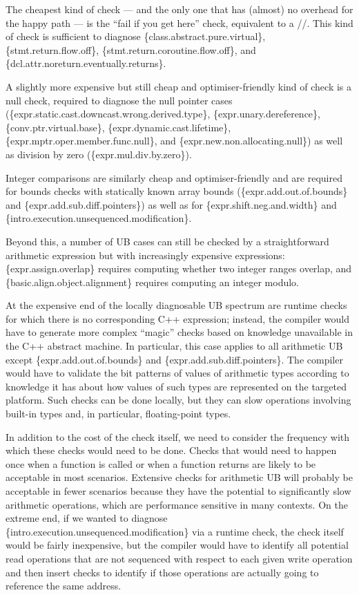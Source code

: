 The cheapest kind of check --- and the only one that has (almost) no overhead for the happy path --- is the ``fail if you get here'' check, equivalent to a //. This kind of check is sufficient to diagnose \{class.abstract.pure.virtual\}, \{stmt.return.flow.off\}, \{stmt.return.coroutine.flow.off\}, and \{dcl.attr.noreturn.eventually.returns\}.

A slightly more expensive but still cheap and optimiser-friendly kind of check is a null check, required to diagnose the null pointer cases  
(\{expr.static.cast.downcast.wrong.derived.type\},
\{expr.unary.deref\-erence\},
\{conv.ptr.virtual.base\},
\{expr.dynamic.cast.lifetime\}, 
\{expr.mptr.oper.member.\linebreak[3]func.null\}, and
\{expr.new.non.allocating.null\})
as well as division by zero (\{expr.mul.div.by.zero\}).

Integer comparisons are similarly cheap and optimiser-friendly and are   required for bounds checks with statically known array bounds
(\{expr.add.out.of.bounds\} and
\{expr.add.sub.diff.pointers\})
as well as for \{expr.shift.neg.and.width\} 
and \{intro.execution.unsequenced.modification\}.

Beyond this, a number of UB cases can still be checked by a straightforward arithmetic expression but with increasingly expensive expressions: \{expr.assign.overlap\} requires computing whether two integer ranges overlap, and  \{basic.align.object.alignment\} requires computing an integer modulo. 

At the expensive end of the locally diagnosable UB spectrum are runtime checks for which there is no corresponding C++ expression; instead, the compiler would have to generate more complex ``magic'' checks based on knowledge unavailable in the C++ abstract machine. In particular, this case applies to all arithmetic UB except \{expr.add.out.of.bounds\} and
\{expr.add.sub.diff.pointers\}. The compiler would have to validate the bit patterns of values of arithmetic types according to knowledge it has about how values of such types are represented on the targeted platform. Such checks can be done locally, but they can slow operations involving built-in types and, in particular, floating-point types.

In addition to the cost of the check itself, we need to consider the frequency with which these checks would need to be done. Checks that would need to happen once when a function is called or when a function returns are likely to be acceptable in most scenarios. Extensive checks for arithmetic UB will probably be acceptable in fewer scenarios because they have the potential to significantly slow arithmetic operations, which are performance sensitive in many contexts. On the extreme end, if we wanted to diagnose \{intro.execution.unsequenced.modification\} via a runtime check, the check itself would be fairly inexpensive, but the compiler would have to identify all potential read operations that are not sequenced with respect to each given write operation and then insert checks to identify if those operations are actually going to reference the same address.

